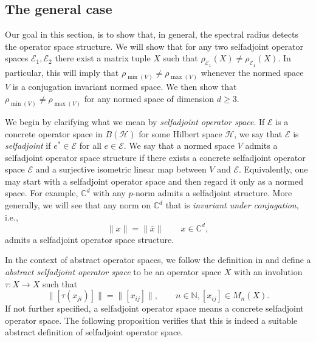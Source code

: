 \documentclass[12pt]{amsart}
\numberwithin{equation}{section}
\theoremstyle{definition}
\newcommand{\cE}{\mathcal{E}}
\newcommand{\cH}{\mathcal{H}}
\begin{document}

\subsection{The general case}\label{subsec:general}


Our goal in this section, is to show that, in general, the spectral radius detects the operator space structure. We will show that for any two selfadjoint operator spaces $\cE_1, \cE_2$ there exist a matrix tuple $X$ such that $\rho_{\cE_1}(X) \neq \rho_{\cE_1}(X)$. In particular, this will imply that $\rho_{\min(V)}\neq\rho_{\max(V)}$ whenever the normed space $V$ is a conjugation invariant normed space. 
We then show that $\rho_{\min(V)}\neq\rho_{\max(V)}$ for any normed space of dimension $d \geq 3$. 

We begin by clarifying what we mean by {\em selfadjoint operator space}. 
If $\mathcal{E}$ is a concrete operator space in $ B(\cH)$ for some Hilbert space $\cH$, we say that $\mathcal{E}$ is \textit{selfadjoint} if $e^*\in\mathcal{E}$ for all $e\in\mathcal{E}$. 
We say that a normed space $V$ admits a selfadjoint operator space structure if there exists a concrete selfadjoint operator space $\mathcal{E}$ and a surjective isometric linear map between $V$ and $\mathcal{E}$. Equivalently, one may start with a selfadjoint operator space and then regard it only as a normed space. For example, $\mathbb{C}^d$ with any $p$-norm admits a selfadjoint structure. More generally, we will see that any norm on $\mathbb{C}^d$ that is \textit{invariant under conjugation}, i.e., 
  \[
    \|x\|=\|\bar x\| \qquad x\in \mathbb{C}^d, 
  \]
admits a selfadjoint operator space structure.


In the context of abstract operator spaces, we follow the definition in \cite{BlecherKirkNealWerner} and define a \textit{abstract selfadjoint operator space} to be an operator space $X$ with an involution $\tau:X\to X$ such that 
  \begin{equation}\label{eq: abstract op space}
    \|[\tau(x_{ji})]\|=\|[x_{ij}]\|, \qquad n\in\mathbb{N}, [x_{ij}]\in M_n(X).
  \end{equation}
If not further specified, a selfadjoint operator space means a concrete selfadjoint operator space. 
The following proposition verifies that this is indeed a suitable abstract definition of selfadjoint operator space.
\end{document}
